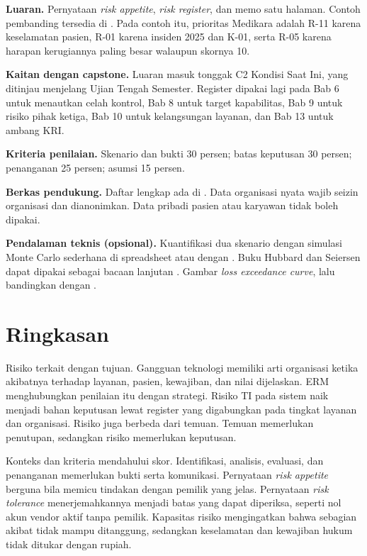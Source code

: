 \textbf{Luaran.} Pernyataan \textit{risk appetite}, \textit{risk register}, dan memo satu halaman.
Contoh pembanding tersedia di . Pada
contoh itu, prioritas Medikara adalah R-11 karena keselamatan pasien, R-01 karena insiden 2025 dan
K-01, serta R-05 karena harapan kerugiannya paling besar walaupun skornya 10.

\textbf{Kaitan dengan capstone.} Luaran masuk tonggak C2 Kondisi Saat Ini, yang ditinjau menjelang
Ujian Tengah Semester. Register dipakai lagi pada Bab 6 untuk menautkan celah kontrol, Bab 8 untuk
target kapabilitas, Bab 9 untuk risiko pihak ketiga, Bab 10 untuk kelangsungan layanan, dan Bab 13
untuk ambang KRI.

\textbf{Kriteria penilaian.} Skenario dan bukti 30 persen; batas keputusan 30 persen; penanganan 25
persen; asumsi 15 persen.

\textbf{Berkas pendukung.} Daftar lengkap ada di . Data
organisasi nyata wajib seizin organisasi dan dianonimkan. Data pribadi pasien atau karyawan tidak
boleh dipakai.

\textbf{Pendalaman teknis (opsional).} Kuantifikasi dua skenario dengan simulasi Monte Carlo
sederhana di spreadsheet atau dengan . Buku Hubbard
dan Seiersen dapat dipakai sebagai bacaan lanjutan \cite{hubbard2023}. Gambar \textit{loss
exceedance curve}, lalu bandingkan dengan .

\section{Ringkasan}

Risiko terkait dengan tujuan. Gangguan teknologi memiliki arti organisasi ketika akibatnya terhadap
layanan, pasien, kewajiban, dan nilai dijelaskan. ERM menghubungkan penilaian itu dengan strategi.
Risiko TI pada sistem naik menjadi bahan keputusan lewat register yang digabungkan pada tingkat
layanan dan organisasi. Risiko juga berbeda dari temuan. Temuan memerlukan penutupan, sedangkan
risiko memerlukan keputusan.

Konteks dan kriteria mendahului skor. Identifikasi, analisis, evaluasi, dan penanganan memerlukan
bukti serta komunikasi. Pernyataan \textit{risk appetite} berguna bila memicu tindakan dengan pemilik
yang jelas. Pernyataan \textit{risk tolerance} menerjemahkannya menjadi batas yang dapat diperiksa,
seperti nol akun vendor aktif tanpa pemilik. Kapasitas risiko mengingatkan bahwa sebagian akibat
tidak mampu ditanggung, sedangkan keselamatan dan kewajiban hukum tidak ditukar dengan rupiah.

